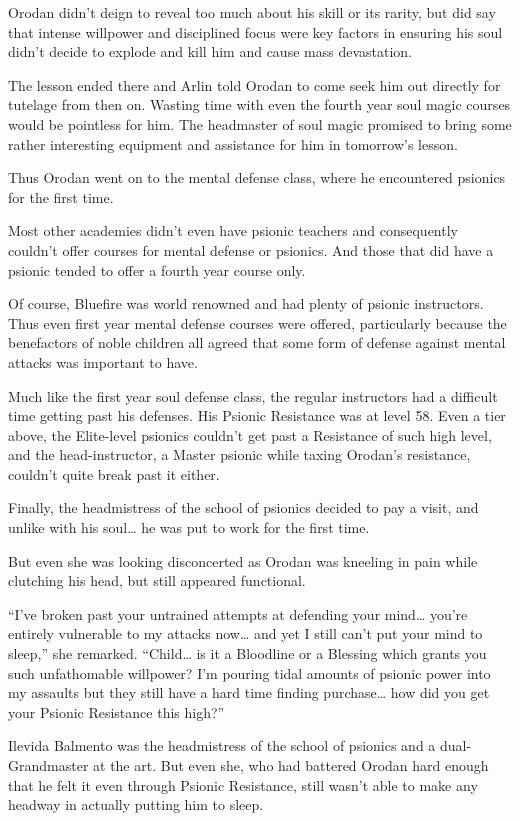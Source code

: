 \documentclass[a4paper,10pt]{book}
\begin{document}
Orodan didn’t deign to reveal too much about his skill or its rarity, but did say that intense willpower and disciplined focus were key factors in ensuring his soul didn’t decide to explode and kill him and cause mass devastation.\par
The lesson ended there and Arlin told Orodan to come seek him out directly for tutelage from then on. Wasting time with even the fourth year soul magic courses would be pointless for him. The headmaster of soul magic promised to bring some rather interesting equipment and assistance for him in tomorrow’s lesson.\par
Thus Orodan went on to the mental defense class, where he encountered psionics for the first time.\par
Most other academies didn’t even have psionic teachers and consequently couldn’t offer courses for mental defense or psionics. And those that did have a psionic tended to offer a fourth year course only.\par
Of course, Bluefire was world renowned and had plenty of psionic instructors. Thus even first year mental defense courses were offered, particularly because the benefactors of noble children all agreed that some form of defense against mental attacks was important to have.\par
Much like the first year soul defense class, the regular instructors had a difficult time getting past his defenses. His Psionic Resistance was at level 58. Even a tier above, the Elite-level psionics couldn’t get past a Resistance of such high level, and the head-instructor, a Master psionic while taxing Orodan’s resistance, couldn’t quite break past it either.\par
Finally, the headmistress of the school of psionics decided to pay a visit, and unlike with his soul… he was put to work for the first time.\par
But even she was looking disconcerted as Orodan was kneeling in pain while clutching his head, but still appeared functional.\par
“I’ve broken past your untrained attempts at defending your mind… you’re entirely vulnerable to my attacks now… and yet I still can’t put your mind to sleep,” she remarked. “Child… is it a Bloodline or a Blessing which grants you such unfathomable willpower? I’m pouring tidal amounts of psionic power into my assaults but they still have a hard time finding purchase… how did you get your Psionic Resistance this high?”\par
Ilevida Balmento was the headmistress of the school of psionics and a dual-Grandmaster at the art. But even she, who had battered Orodan hard enough that he felt it even through Psionic Resistance, still wasn’t able to make any headway in actually putting him to sleep.\par
\end{document}
